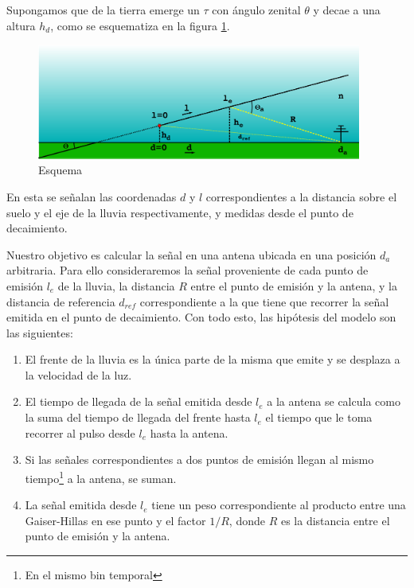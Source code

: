 	Supongamos que de la tierra emerge un $\tau$ con ángulo zenital $\theta$ y decae a una altura $h_d$, como se esquematiza en la figura \ref{fig:esRadio_schema}. 
	\begin{figure}[ht!]
		\centering
		\includegraphics[width=0.95\textwidth]{./fig/EASRadio/timeDelaySchema}
		\caption{\label{fig:esRadio_schema}
		Esquema 
		}
	\end{figure}
	En esta se señalan las coordenadas $d$ y $l$ correspondientes a la distancia sobre el suelo y el eje de la lluvia respectivamente, y medidas desde el punto de decaimiento.
	
	Nuestro objetivo es calcular la señal en una antena ubicada en una posición $d_a$ arbitraria.
	Para ello consideraremos la señal proveniente de cada punto de emisión $l_e$ de la lluvia, la distancia $R$ entre el punto de emisión y la antena, y la distancia de referencia $d_{ref}$ correspondiente a la que tiene que recorrer la señal emitida en el punto de decaimiento.
	Con todo esto, las hipótesis del modelo son las siguientes:
	\begin{enumerate}
	 \item El frente de la lluvia es la única parte de la misma que emite y se desplaza a la velocidad de la luz.
	 \item El tiempo de llegada de la señal emitida desde $l_e$ a la antena se calcula como la suma del tiempo de llegada del frente hasta $l_e$ el tiempo que le toma recorrer al pulso desde $l_e$ hasta la antena.
	 \item Si las señales correspondientes a dos puntos de emisión llegan al mismo tiempo\footnote{En el mismo bin temporal} a la antena, se suman.
	 \item La señal emitida desde $l_e$ tiene un peso correspondiente al producto entre una Gaiser-Hillas en ese punto y el factor $1/R$, donde $R$ es la distancia entre el punto de emisión y la antena.
	\end{enumerate}
	
